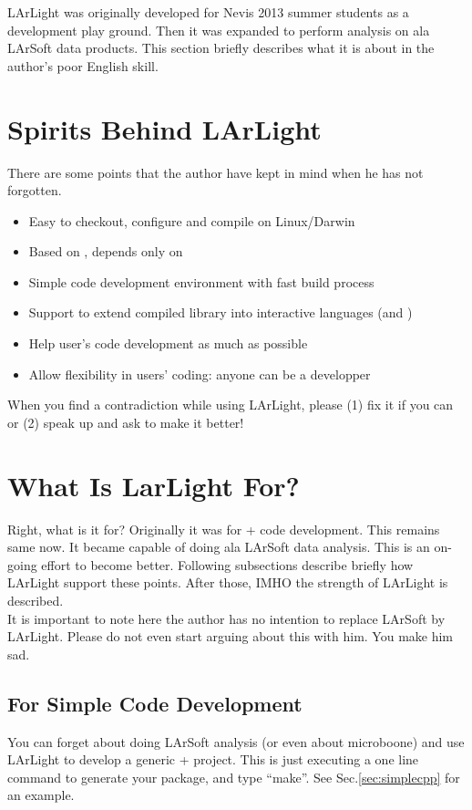 
LArLight was originally developed for Nevis 2013 summer students as a \CPP development play ground.
Then it was expanded to perform analysis on ala LArSoft data products. 
This section briefly describes what it is about in the author's poor English skill.

\section{Spirits Behind LArLight}
There are some points that the author have kept in mind when he has not forgotten.
\begin{itemize}
\item Easy to checkout, configure and compile on Linux/Darwin
\item Based on \CPP, depends only on \ROOT
\item Simple code development environment with fast build process
\item Support to extend compiled library into interactive languages (\python and \CINT)
\item Help user's code development as much as possible
\item Allow flexibility in users' coding: anyone can be a developper
\end{itemize}
When you find a contradiction while using LArLight, please (1) fix it if you can or (2) speak up and ask to make it better! 

\section{What Is LarLight For?}
Right, what is it for?
Originally it was for \CPP + \ROOT code development. This remains same now.
It became capable of doing ala LArSoft data analysis. This is an on-going effort to become better.
Following subsections describe briefly how LArLight support these points.
After those, IMHO the strength of LArLight is described.\\

It is important to note here the author has no intention to replace LArSoft by LArLight. 
Please do not even start arguing about this with him. You make him sad.

\subsection{For Simple \CPP Code Development}
You can forget about doing LArSoft analysis (or even about microboone) and use LArLight to develop a generic \CPP + \ROOT project. This is just executing a one line command to generate your package, and type ``make''. See Sec.\ref{sec:simplecpp} for an example.

